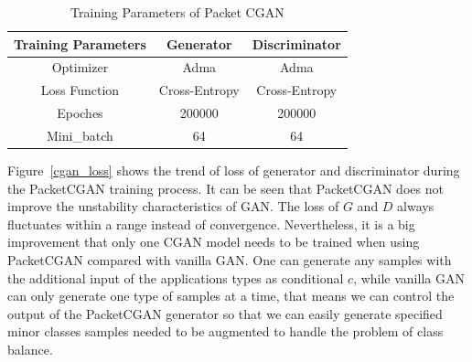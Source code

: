\documentclass[conference]{IEEEtran}
\begin{document}
\linespread{1.5}
\begin{table}[htbp]
	\fontsize{6.5}{8}
	\caption{Training Parameters of Packet CGAN}
	\begin{center}
		\begin{tabular}{c c c }
			\hline
			\textbf{Training Parameters}&{\textbf{Generator}}&{\textbf{Discriminator}} \\
			\hline
			Optimizer & Adma & Adma   \\
			Loss Function & Cross-Entropy & Cross-Entropy  \\
			Epoches & 200000 & 200000 \\
			Mini\_batch & 64 & 64 \\
			\hline
		\end{tabular}
		\label{training_parameters}
	\end{center}
\end{table}


Figure~\ref{cgan_loss} shows the trend of loss of generator and discriminator during the PacketCGAN training process. It can be seen that PacketCGAN does not improve the unstability characteristics of GAN. The loss of $G$ and $D$ always fluctuates within a range instead of convergence. Nevertheless, it is a big improvement that only one CGAN model needs to be trained when using PacketCGAN compared with vanilla GAN. One can generate any samples with the additional input of the applications types as conditional $c$, while vanilla GAN can only generate one type of samples at a time, that means we can control the output of the PacketCGAN generator so that we can easily generate specified minor classes samples needed to be augmented to handle the problem of class balance. 
\end{document}
